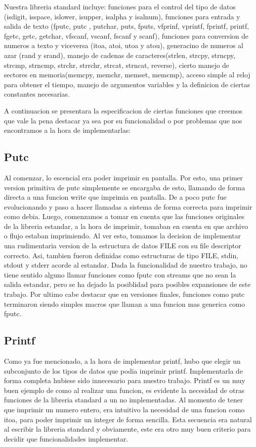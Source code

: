 \documentclass[a4paper,10pt]{article}
\begin{document}
    Nuestra libreria standard incluye: funciones para el control del tipo de datos (isdigit, isspace, islower, isupper, isalpha y isalnum), funciones para entrada y salida de texto (fputc, putc , putchar, puts, fputs, vfprinf, vprintf, fprintf, printf, fgetc, getc, getchar, vfscanf, vscanf, fscanf y scanf), funciones para conversion de numeros a texto y viceversa (itoa, atoi, utoa y atou), generacino de numeros al azar (rand y srand), manejo de cadenas de caracteres(strlen, strcpy, strncpy, strcmp, strncmp, strchr, strrchr, strcat, strncat, reverse), cierto manejo de sectores en memoria(memcpy, memchr, memset, memcmp), acceso simple al reloj para obtener el tiempo, manejo de argumentos variables y la definicion de ciertas constantes necesarias.

    A continuacion se presentara la especificacion de ciertas funciones que creemos que vale la pena destacar ya sea por su funcionalidad o por problemas que nos encontramos a la hora de implementarlas:

    \subsection{Putc}
        Al comenzar, lo escencial era poder imprimir en pantalla. Por esto, una primer version primitiva de putc simplemente se encargaba de esto, llamando de forma directa a una funcion write que imprimia en pantalla. De a poco putc fue evolucionando y paso a hacer llamadas a sistema de forma correcta para imprimir como debia.
        Luego, comenzamos a tomar en cuenta que las funciones originales de la libreria estandar, a la hora de imprimir, tomaban en cuenta en que archivo o flujo estaban imprimiendo. Al ver esto, tomamos la decision de implementar una rudimentaria version de la estructura de datos FILE con su file descriptor correcto. Asi, tambien fueron definidas como estructuras de tipo FILE, stdin, stdout y stderr acorde al estandar. Dada la funcionalidad de nuestro trabajo, no tiene sentido alguno llamar funciones como fputc con streams que no sean la salida estandar, pero se ha dejado la posiblidad para posibles expansiones de este trabajo.
        Por ultimo cabe destacar que en versiones finales, funciones como putc terminaron siendo simples macros que llaman a una funcion mas generica como fputc.

    \subsection{Printf}
        Como ya fue mencionado, a la hora de implementar printf, hubo que elegir un subconjunto de los tipos de datos que podia imprimir printf. Implementarla de forma completa hubiese sido innecesario para nuestro trabajo. Printf es un muy buen ejemplo de como al realizar una funcion, es evidente la necesidad de otras funciones de la libreria standard a un no implementadas. Al momento de tener que imprimir un numero entero, era intuitivo la necesidad de una funcion como itoa, para poder imprimir un integer de forma sencilla. Esta secuencia era natural al escribir la libreria standard y obviamente, este era otro muy buen criterio para decidir que funcionalidades implementar.
\end{document}
